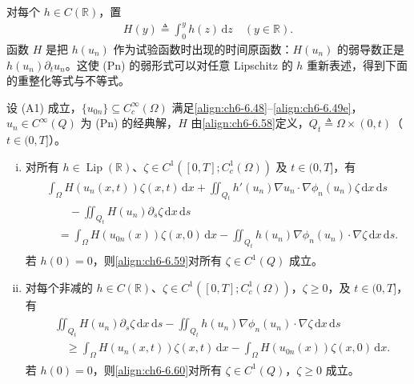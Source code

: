 \documentclass[../../main.tex]{subfiles}%
\begin{document}
对每个 $h\in C(\mathbb{R})$，置
\begin{align}
H(y)\triangleq\int_0^yh(z)\,\mathrm{d}z\quad(y\in\mathbb{R}). \label{align:ch6-6.58}
\end{align}
函数 $H$ 是把 $h(u_n)$ 作为试验函数时出现的时间原函数：$H(u_n)$ 的弱导数正是 $h(u_n)\partial_tu_n$。这使 (Pn) 的弱形式可以对任意 Lipschitz 的 $h$ 重新表述，得到下面的重整化等式与不等式。

\begin{lemma}[重整化等式与不等式]\label{lemma:ch06-6.5.4}
设 (A1) 成立，$\{u_{0n}\}\subseteq C^\infty_c(\Omega)$ 满足\eqref{align:ch6-6.48}--\eqref{align:ch6-6.49e}，$u_n\in C^\infty(Q)$ 为 (Pn) 的经典解，$H$ 由\eqref{align:ch6-6.58}定义，$Q_t\triangleq\Omega\times(0,t)$（$t\in(0,T]$）。
\begin{enumerate}[(i)]
\item 对所有 $h\in\operatorname{Lip}(\mathbb{R})$、$\zeta\in C^1([0,T];C^1_c(\Omega))$ 及 $t\in(0,T]$，有
\begin{align}
\label{align:ch6-6.59}
\begin{aligned}
&\int_\Omega H(u_n(x,t))\zeta(x,t)\,\mathrm{d}x
+\iint_{Q_t}h'(u_n)\nabla u_n\cdot\nabla\phi_n(u_n)\zeta\,\mathrm{d}x\,\mathrm{d}s\\
&\qquad-\iint_{Q_t}H(u_n)\partial_s\zeta\,\mathrm{d}x\,\mathrm{d}s\\
&\quad=\int_\Omega H(u_{0n}(x))\zeta(x,0)\,\mathrm{d}x
-\iint_{Q_t}h(u_n)\nabla\phi_n(u_n)\cdot\nabla\zeta\,\mathrm{d}x\,\mathrm{d}s.
\end{aligned}
\end{align}
若 $h(0)=0$，则\eqref{align:ch6-6.59}对所有 $\zeta\in C^1(Q)$ 成立。
\item 对每个非减的 $h\in C(\mathbb{R})$、$\zeta\in C^1([0,T];C^1_c(\Omega))$，$\zeta\geqslant0$，及 $t\in(0,T]$，有
\begin{align}
\label{align:ch6-6.60}
\begin{aligned}
&\iint_{Q_t}H(u_n)\partial_s\zeta\,\mathrm{d}x\,\mathrm{d}s
-\iint_{Q_t}h(u_n)\nabla\phi_n(u_n)\cdot\nabla\zeta\,\mathrm{d}x\,\mathrm{d}s\\
&\quad\geqslant\int_\Omega H(u_n(x,t))\zeta(x,t)\,\mathrm{d}x
-\int_\Omega H(u_{0n}(x))\zeta(x,0)\,\mathrm{d}x.
\end{aligned}
\end{align}
若 $h(0)=0$，则\eqref{align:ch6-6.60}对所有 $\zeta\in C^1(Q)$，$\zeta\geqslant0$ 成立。
\end{enumerate}
\end{lemma}
\end{document}
